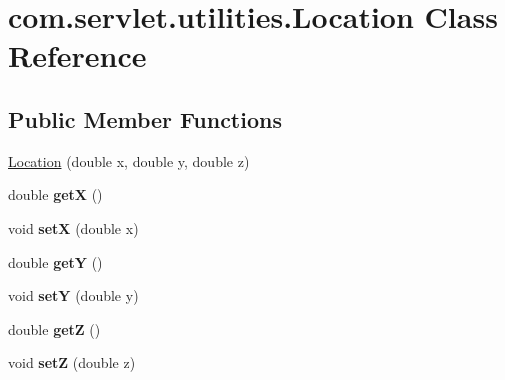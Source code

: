 \hypertarget{classcom_1_1servlet_1_1utilities_1_1_location}{}\section{com.\+servlet.\+utilities.\+Location Class Reference}
\label{classcom_1_1servlet_1_1utilities_1_1_location}
\subsection*{Public Member Functions}
\begin{DoxyCompactItemize}
\item 
\hyperlink{classcom_1_1servlet_1_1utilities_1_1_location_a7ee19224df4270b035459a2d82d4e0cb}{Location} (double x, double y, double z)
\item 
double {\bfseries getX} ()\hypertarget{classcom_1_1servlet_1_1utilities_1_1_location_a5be2885727b60b75f856bab5ba7dbd99}{}\label{classcom_1_1servlet_1_1utilities_1_1_location_a5be2885727b60b75f856bab5ba7dbd99}

\item 
void {\bfseries setX} (double x)\hypertarget{classcom_1_1servlet_1_1utilities_1_1_location_ae06014f28357a9bbf426264e2ea0995e}{}\label{classcom_1_1servlet_1_1utilities_1_1_location_ae06014f28357a9bbf426264e2ea0995e}

\item 
double {\bfseries getY} ()\hypertarget{classcom_1_1servlet_1_1utilities_1_1_location_afffc19a079cbdc9d2cf14ec6083eab79}{}\label{classcom_1_1servlet_1_1utilities_1_1_location_afffc19a079cbdc9d2cf14ec6083eab79}

\item 
void {\bfseries setY} (double y)\hypertarget{classcom_1_1servlet_1_1utilities_1_1_location_acb8e5832a7cc003f2d80b3db6af6d453}{}\label{classcom_1_1servlet_1_1utilities_1_1_location_acb8e5832a7cc003f2d80b3db6af6d453}

\item 
double {\bfseries getZ} ()\hypertarget{classcom_1_1servlet_1_1utilities_1_1_location_ab9d7184b700cf72fb44acb21635d0c89}{}\label{classcom_1_1servlet_1_1utilities_1_1_location_ab9d7184b700cf72fb44acb21635d0c89}

\item 
void {\bfseries setZ} (double z)\hypertarget{classcom_1_1servlet_1_1utilities_1_1_location_a2976c91c6e8269ec0351f1ed686f2bae}{}\label{classcom_1_1servlet_1_1utilities_1_1_location_a2976c91c6e8269ec0351f1ed686f2bae}

\end{DoxyCompactItemize}


